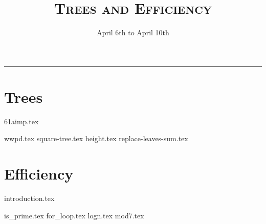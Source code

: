 \documentclass{exam}
\title{\textsc{Trees and Efficiency}}
\date{April 6th to April 10th}
\begin{document}
\maketitle
\rule{\textwidth}{0.15em}
\fontsize{12}{15}\selectfont


\section{Trees}
{61aimp.tex}
\newpage

\begin{questions}
{wwpd.tex}
\newpage
{square-tree.tex}
\vspace{100}
{height.tex} 
\newpage
{replace-leaves-sum.tex}
\end{questions}

\newpage
\section{Efficiency}


{introduction.tex}
\newpage
\begin{questions}
{is_prime.tex} 
{for_loop.tex} 
\newpage
{logn.tex} 
\vspace{40}
{mod7.tex} 
\end{questions}
\end{document}
